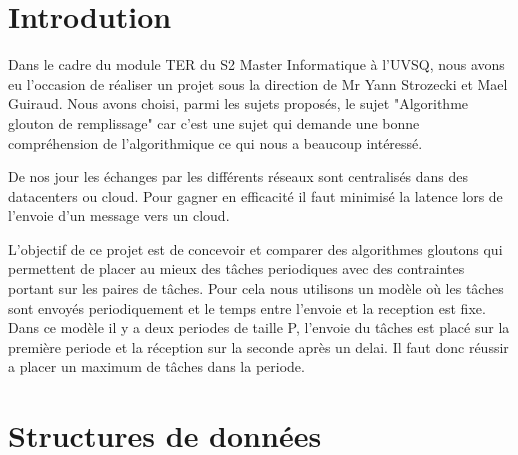 \documentclass[11pt]{article}
\title{\vspace{13em}{\huge TER}}
\author{Rémi Navarro - 21401257\\ Edouard Fouassier - 21400750}
\begin{document}
\clearpage
\maketitle\vspace{13em}
\newpage
\tableofcontents
\newpage
\clearpage
{}

\section{Introdution}
Dans le cadre du module TER du S2 Master Informatique à l’UVSQ, nous avons eu l’occasion de réaliser un projet sous la direction de Mr Yann Strozecki et Mael Guiraud.
Nous avons choisi, parmi les sujets proposés, le sujet "Algorithme glouton de remplissage" car c'est une sujet qui demande une bonne compréhension de l'algorithmique ce qui nous a beaucoup intéressé.

De nos jour les échanges par les différents réseaux sont centralisés dans des datacenters ou cloud.
Pour gagner en efficacité il faut minimisé la latence lors de l'envoie d'un message vers un cloud.

L'objectif de ce projet est de concevoir et comparer des algorithmes gloutons qui permettent de placer au mieux des tâches periodiques avec des contraintes portant sur les paires de tâches.
Pour cela nous utilisons un modèle où les tâches sont envoyés periodiquement et le temps entre l'envoie et la reception est fixe.
Dans ce modèle il y a deux periodes de taille P, l'envoie du tâches est placé sur la première periode et la réception sur la seconde après un delai.
Il faut donc réussir a placer un maximum de tâches dans la periode.

\section{Structures de données}
\end{document}
